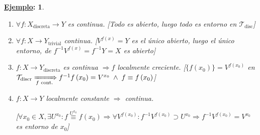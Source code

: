 \documentclass[10pt,a4paper,openright]{book}
\theoremstyle{break}
\newtheorem*{ej}{\underline{Ejemplo}:}
\begin{document}
\begin{ej}
\begin{enumerate}
    \item $\forall f: X_{\text{discreta}} \rightarrow Y$ es continua. [Todo es abierto, luego todo es entorno en $\mathcal{T}_{\text{disc}}$]
    \item $\forall f: X \rightarrow Y_{\text{trivial}}$ continua. [$V^{f\left( x \right)} = Y$ es el único abierto, luego el único entorno, de $f^{-1}V^{f\left( x \right)} = f^{-1}Y = X$ es abierto]
    \item $f: X \rightarrow Y_{\text{discreta}}$ es continua $\Rightarrow f$ localmente creciente.
        [$\{f\left( x_0 \right)\} = V^{f\left( x_0 \right)}$ en $\mathcal{T}_{\text{discr}} \xRightarrow[f\text{ cont.}]{} f^{-1}f\left( x_0 \right) = V^{x_0}\; \land \;f \equiv f\left( x_0 \right)$]
    \item $f: X \rightarrow Y$ localmente constante $\Rightarrow$ continua.

    [$\forall x_0 \in X, \exists U^{x_0} : f \stackrel{U^{x_0}}{\equiv} f\left( x_0 \right) \Rightarrow \forall V^{f\left( x_0 \right)}: f^{-1}V^{f\left( x_0 \right)} \supset U^{x_0} \Rightarrow f^{-1}V^{f\left( x_0 \right)} = V^{x_0}$ es entorno de $x_0$]
\end{enumerate}
\end{ej}
\end{document}
